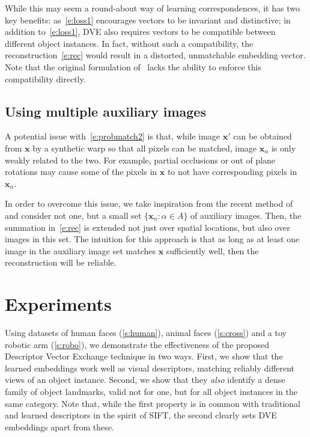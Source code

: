 \documentclass[10pt,twocolumn,letterpaper]{article}
\newcommand{\bx}{\mathbf{x}}
\begin{document}
While this may seem a round-about way of learning correspondences, it has two key benefits: as~\cref{e:loss1} encourages vectors to be invariant and distinctive; in addition to~\cref{e:loss1}, DVE also requires vectors to be compatible between different object instances.
In fact, without such a compatibility, the reconstruction~\eqref{e:rec} would result in a distorted, unmatchable embedding vector.
Note that the original formulation of~\cite{thewlis17Bunsupervised} lacks the ability to enforce this compatibility directly.


\subsection{Using multiple auxiliary images}\label{s:group}

A potential issue with~\cref{e:probmatch2} is that, while image $\bx'$ can be obtained from $\bx$ by a synthetic warp so that all pixels can be matched, image $\bx_\alpha$ is only weakly related to the two.
For example, partial occlusions or out of plane rotations may cause some of the pixels in $\bx$ to not have corresponding pixels in $\bx_\alpha$.

In order to overcome this issue, we take inspiration from the recent method of~\cite{zhuang17attend} and consider not one, but a small set $\{\bx_\alpha : \alpha \in A\}$ of auxiliary images.
Then, the summation in~\cref{e:rec} is extended not just over spatial locations, but also over images in this set.
The intuition for this approach is that as long as at least one image in the auxiliary image set matches $\bx$ sufficiently well, then the reconstruction will be reliable. 

\section{Experiments}\label{s:experiments}



Using datasets of human faces (\cref{s:human}), animal faces (\cref{s:cross}) and a toy robotic arm (\cref{s:robo}), we demonstrate the effectiveness of the proposed Descriptor Vector Exchange technique in two ways.
First, we show that the learned embeddings work well as visual descriptors, matching reliably different views of an object instance.
Second, we show that they \emph{also} identify a dense family of object landmarks, valid not for one, but for all object instances in the same category.
Note that, while the first property is in common with traditional and learned descriptors in the spirit of SIFT, the second clearly sets DVE embeddings apart from these.
\end{document}

